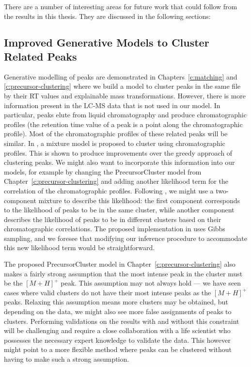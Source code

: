 There are a number of interesting areas for future work that could follow from the results in this thesis. They are discussed in the following sections:

\subsection{Improved Generative Models to Cluster Related Peaks}

Generative modelling of peaks are demonstrated in Chapters~\ref{c:matching} and \ref{c:precursor-clustering} where we build a model to cluster peaks in the same file by their RT values and explainable mass transformations. However, there is more information present in the LC-MS data that is not used in our model. In particular, peaks elute from liquid chromatography and produce chromatographic profiles (the retention time value of a peak is a point along the chromatographic profile). Most of the chromatographic profiles of these related peaks will be similar. In \cite{Rogers2012}, a mixture model is proposed to cluster using chromatographic profiles. This is shown to produce improvements over the greedy approach of clustering peaks. We might also want to incorporate this information into our models, for example by changing the PrecursorCluster model from Chapter~\ref{c:precursor-clustering} and adding another likelihood term for the correlation of the chromatographic profiles. Following \cite{Rogers2012}, we might use a two-component mixture to describe this likelihood: the first component corresponds to the likelihood of peaks to be in the same cluster, while another component describes the likelihood of peaks to be in different clusters based on their chromatographic correlations. The proposed implementation in \cite{Rogers2012} uses Gibbs sampling, and we foresee that modifying our inference procedure to accommodate this new likelihood term would be straightforward.

The proposed PrecursorCluster model in Chapter~\ref{c:precursor-clustering} also makes a fairly strong assumption that the most intense peak in the cluster must be the $[M+H]^+$ peak. This assumption may not always hold --- we have seen cases where valid clusters do not have their most intense peaks as the $[M+H]^+$ peaks. Relaxing this assumption means more clusters may be obtained, but depending on the data, we might also see more false assignments of peaks to clusters. Performing validations on the results with and without this constraint will be challenging and require a close collaboration with a life scientist who possesses the necessary expert knowledge to validate the data. This however might point to a more flexible method where peaks can be clustered without having to make such a strong assumption.

